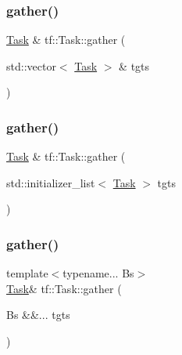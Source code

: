 \mbox{\label{classtf_1_1Task_a915feb8a514095f1b98afb857e53e539}} 
\subsubsection{\texorpdfstring{gather()}{gather()}\hspace{0.1cm}{\footnotesize\ttfamily [2/4]}}
{\footnotesize\ttfamily \hyperlink{classtf_1_1Task}{Task} \& tf\+::\+Task\+::gather (\begin{DoxyParamCaption}\item[{std\+::vector$<$ \hyperlink{classtf_1_1Task}{Task} $>$ \&}]{tgts }\end{DoxyParamCaption})\hspace{0.3cm}{\ttfamily [inline]}}

\mbox{\label{classtf_1_1Task_a57a5b65d54bed7e6319500239e35dc19}} 
\subsubsection{\texorpdfstring{gather()}{gather()}\hspace{0.1cm}{\footnotesize\ttfamily [3/4]}}
{\footnotesize\ttfamily \hyperlink{classtf_1_1Task}{Task} \& tf\+::\+Task\+::gather (\begin{DoxyParamCaption}\item[{std\+::initializer\+\_\+list$<$ \hyperlink{classtf_1_1Task}{Task} $>$}]{tgts }\end{DoxyParamCaption})\hspace{0.3cm}{\ttfamily [inline]}}

\mbox{\label{classtf_1_1Task_affdecfa1c16d46eb7d8eec1b63e5eed9}} 
\subsubsection{\texorpdfstring{gather()}{gather()}\hspace{0.1cm}{\footnotesize\ttfamily [4/4]}}
{\footnotesize\ttfamily template$<$typename... Bs$>$ \\
\hyperlink{classtf_1_1Task}{Task}\& tf\+::\+Task\+::gather (\begin{DoxyParamCaption}\item[{Bs \&\&...}]{tgts }\end{DoxyParamCaption})}

